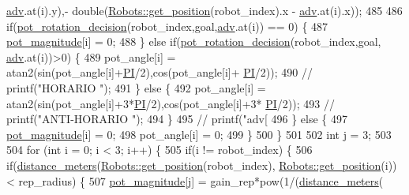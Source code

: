 \begin{DoxyCode}
      \hyperlink{class_strategy_a4ebbce7f034aaca32adbd4f9607642d9}{adv}.at(i).y),- \textcolor{keywordtype}{double}(\hyperlink{class_robots_a1fca8f2f5070176faa6ba1efa2f1ff14}{Robots::get\_position}(robot\_index).x - 
      \hyperlink{class_strategy_a4ebbce7f034aaca32adbd4f9607642d9}{adv}.at(i).x));
485 
486             \textcolor{keywordflow}{if}(\hyperlink{class_strategy_abc4ef2ab65f3864218c1736d7c35d46a}{pot\_rotation\_decision}(robot\_index,goal,\hyperlink{class_strategy_a4ebbce7f034aaca32adbd4f9607642d9}{adv}.at(i)) == 0) \{
487                 \hyperlink{class_strategy_afbe79a1885f82b70c71eb30d07fde921}{pot\_magnitude}[i] = 0;
488             \} \textcolor{keywordflow}{else} \textcolor{keywordflow}{if}(\hyperlink{class_strategy_abc4ef2ab65f3864218c1736d7c35d46a}{pot\_rotation\_decision}(robot\_index,goal,
      \hyperlink{class_strategy_a4ebbce7f034aaca32adbd4f9607642d9}{adv}.at(i))>0) \{
489                     pot\_angle[i] = atan2(sin(pot\_angle[i]+\hyperlink{strategy_8cpp_a598a3330b3c21701223ee0ca14316eca}{PI}/2),cos(pot\_angle[i]+
      \hyperlink{strategy_8cpp_a598a3330b3c21701223ee0ca14316eca}{PI}/2));
490                     \textcolor{comment}{// printf("HORARIO ");}
491             \} \textcolor{keywordflow}{else} \{
492                 pot\_angle[i] = atan2(sin(pot\_angle[i]+3*\hyperlink{strategy_8cpp_a598a3330b3c21701223ee0ca14316eca}{PI}/2),cos(pot\_angle[i]+3*
      \hyperlink{strategy_8cpp_a598a3330b3c21701223ee0ca14316eca}{PI}/2));
493                     \textcolor{comment}{// printf("ANTI-HORARIO ");}
494             \}
495             \textcolor{comment}{// printf("adv[%
496         \} \textcolor{keywordflow}{else} \{
497             \hyperlink{class_strategy_afbe79a1885f82b70c71eb30d07fde921}{pot\_magnitude}[i] = 0;
498             pot\_angle[i] = 0;
499         \}
500     \}
501 
502     \textcolor{keywordtype}{int} j = 3;
503 
504     \textcolor{keywordflow}{for} (\textcolor{keywordtype}{int} i = 0; i < 3; i++) \{
505         \textcolor{keywordflow}{if}(i != robot\_index) \{
506             \textcolor{keywordflow}{if}(\hyperlink{class_strategy_a4052503aaa94bdbc1fca9f552ef96dbb}{distance\_meters}(\hyperlink{class_robots_a1fca8f2f5070176faa6ba1efa2f1ff14}{Robots::get\_position}(robot\_index), 
      \hyperlink{class_robots_a1fca8f2f5070176faa6ba1efa2f1ff14}{Robots::get\_position}(i)) < rep\_radius) \{
507                 \hyperlink{class_strategy_afbe79a1885f82b70c71eb30d07fde921}{pot\_magnitude}[j] = gain\_rep*pow(1/(\hyperlink{class_strategy_a4052503aaa94bdbc1fca9f552ef96dbb}{distance\_meters}(
}
\end{DoxyCode}

